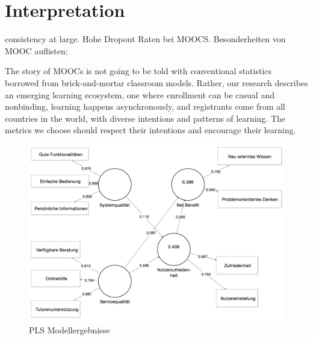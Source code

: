 \section{Interpretation}
\label{sec:vergleich}

\todo consistency at large. 
Hohe Dropout Raten bei MOOCS. Besonderheiten von MOOC auflisten: 


The story of MOOCs is not going to be told with conventional statistics borrowed from brick-and-mortar classroom models. Rather, our research describes an emerging learning ecosystem, one where enrollment can be casual and nonbinding, learning happens asynchronously, and registrants come from all countries in the world, with diverse intentions and patterns of learning. The metrics we choose should respect their intentions and encourage their learning.\parencite{reich2014tricky}


\begin{figure}[h]
\centering
\includegraphics[width=1\textwidth]{Grafiken/pls_bw_3.png}
\caption{PLS Modellergebnisse}
\label{PLS Modellergebnisse}
\end{figure}